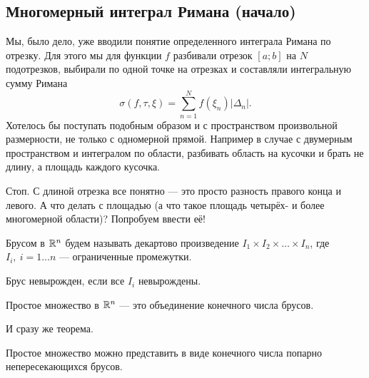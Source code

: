 	\subsection{Многомерный интеграл Римана (начало)}
	Мы, было дело, уже вводили понятие определенного интеграла Римана по отрезку. Для этого мы для функции $f$ разбивали отрезок $[a; b]$ на $N$ подотрезков, выбирали по одной точке на отрезках и составляли интегральную сумму Римана
	$$
		\sigma(f, \tau, \xi) = \sum\limits_{n =1}^{N}f(\xi_n)|\Delta_n|.
	$$
	Хотелось бы поступать подобным образом и с пространством произвольной размерности, не только с одномерной прямой. Например в случае с двумерным пространством и интегралом по области, разбивать область на кусочки и брать не длину, а площадь каждого кусочка. 
	\par Стоп. С длиной отрезка все понятно --- это просто разность правого конца и левого. А что делать с площадью (а что такое площадь четырёх- и более многомерной области)? Попробуем ввести её!
	\begin{Def}
		Брусом в $\mathbb{R}^n$ будем называть декартово произведение $I_1\times I_2\times\ldots \times I_n$, где $I_i,\ i = 1\dots n$ --- ограниченные промежутки.
	\end{Def}
	Брус невырожден, если все $I_i$ невырождены.
	\begin{Def}
		Простое множество в $\mathbb{R}^n$ --- это объединение конечного числа брусов. 
	\end{Def}
	И сразу же теорема.
	\begin{Theorem}
		Простое множество можно представить в виде конечного числа попарно непересекающихся брусов.
	\end{Theorem} 
